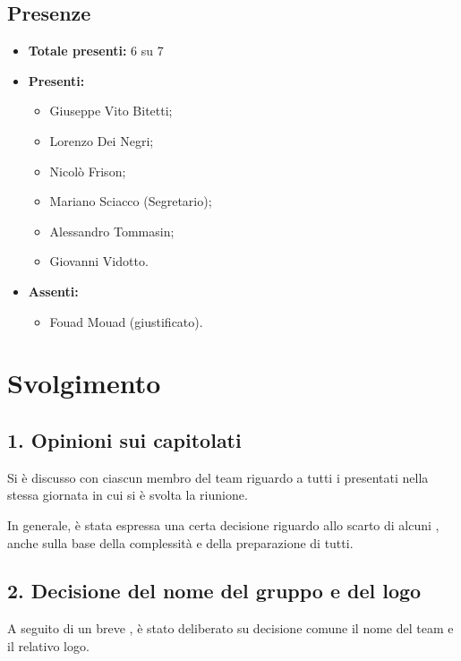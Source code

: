 \subsection*{Presenze}
	\begin{itemize}
		\item \textbf{Totale presenti:} 6 su 7
		\item \textbf{Presenti: }

			\begin{itemize}			
				\item Giuseppe Vito Bitetti;
				\item Lorenzo Dei Negri;
				\item Nicolò Frison;
				\item Mariano Sciacco (Segretario);
				\item Alessandro Tommasin;
				\item Giovanni Vidotto.
			\end{itemize}
		\item \textbf{Assenti: } 
			\begin{itemize}	

				\item Fouad Mouad (giustificato).
			\end{itemize}
	\end{itemize}


\newpage
\section*{Svolgimento}

\subsection*{1. Opinioni sui capitolati}

Si è discusso con ciascun membro del team riguardo a tutti i  presentati nella stessa giornata in cui si è svolta la riunione.

In generale, è stata espressa una certa decisione riguardo allo scarto di alcuni , anche sulla base della complessità e della preparazione di tutti.

\subsection*{2. Decisione del nome del gruppo e del logo}

A seguito di un breve , è stato deliberato su decisione comune il nome del team e il relativo logo.


